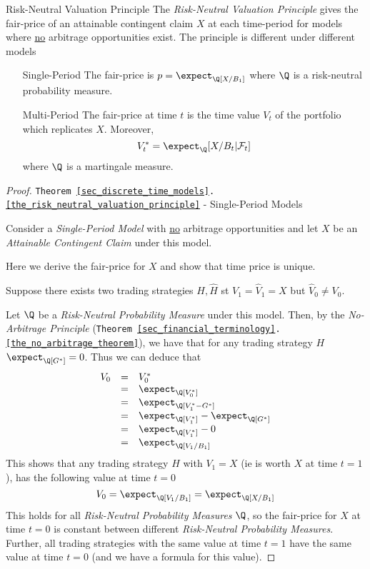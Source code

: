 \documentclass[11pt,a4paper]{article}
\begin{document}
  \begin{theorem}{Risk-Neutral Valuation Principle}\label{the_risk_neutral_valuation_principle}
    The \textit{Risk-Neutral Valuation Principle} gives the fair-price of an attainable contingent claim $X$ at each time-period for models where \underline{no} arbitrage opportunities exist. The principle is different under different models
    \begin{itemize}
      \item[Single-Period] The fair-price is $p=\expect_\Q[X/B_1]$ where $\Q$ is a risk-neutral probability measure.
      \item[Multi-Period] The fair-price at time $t$ is the time value $V_t$ of the portfolio which replicates $X$. Moreover,
      \[ V_t^*=\expect_\Q[X/B_t|\mathcal{F}_t] \]
      where $\Q$ is a martingale measure.
    \end{itemize}
  \end{theorem}

  \begin{proof}{\texttt{Theorem \ref{sec_discrete_time_models}.\ref{the_risk_neutral_valuation_principle}} - Single-Period Models}\label{prf_risk_neutral_valuation_principle}
    \par Consider a \textit{Single-Period Model} with \underline{no} arbitrage opportunities and let $X$ be an \textit{Attainable Contingent Claim} under this model.
    \par Here we derive the fair-price for $X$ and show that time price is unique.
    \par Suppose there exists two trading strategies $H,\hat{H}$ st $V_1=\hat{V}_1=X$ but $\hat{V}_0\neq V_0$.
    \par Let $\Q$ be a \textit{Risk-Neutral Probability Measure} under this model. Then, by the \textit{No-Arbitrage Principle} (\texttt{Theorem \ref{sec_financial_terminology}.\ref{the_no_arbitrage_theorem}}), we have that for any trading strategy $H$ $\expect_\Q[G^*]=0$. Thus we can deduce that
    \[\begin{array}{rcl}
      V_0&=&V_0^*\\
      &=&\expect_\Q[V_0^*]\\
      &=&\expect_\Q[V_1^*-G^*]\\
      &=&\expect_\Q[V_1^*]-\expect_\Q[G^*]\\
      &=&\expect_\Q[V_1^*]-0\\
      &=&\expect_\Q[V_1/B_1]
    \end{array}\]
    This shows that any trading strategy $H$ with $V_1=X$ (ie is worth $X$ at time $t=1$), has the following value at time $t=0$
    \[ V_0=\expect_\Q[V_1/B_1]=\expect_\Q[X/B_1] \]
    This holds for all \textit{Risk-Neutral Probability Measures} $\Q$, so the fair-price for $X$ at time $t=0$ is constant between different \textit{Risk-Neutral Probability Measures}. Further, all trading strategies with the same value at time $t=1$ have the same value at time $t=0$ (and we have a formula for this value).\proved
  \end{proof}
\end{document}
